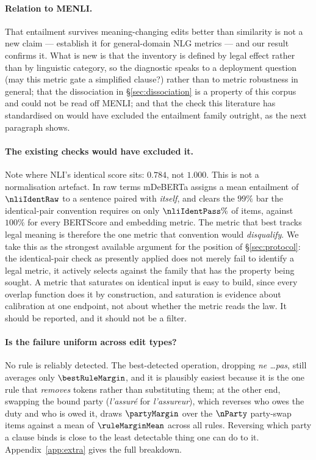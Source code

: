\documentclass[11pt]{article}
\begin{document}
\paragraph{Relation to \textsc{MENLI}.}
That entailment survives meaning-changing edits better than similarity is not a
new claim --- \citet{chen2023menli} establish it for general-domain NLG metrics
--- and our result confirms it. What is new is that the inventory is defined by
legal effect rather than by linguistic category, so the diagnostic speaks to a
deployment question (may this metric gate a simplified clause?) rather than to
metric robustness in general; that the dissociation in \S\ref{sec:dissociation}
is a property of this corpus and could not be read off \textsc{MENLI}; and that
the check this literature has standardised on would have excluded the entailment
family outright, as the next paragraph shows.

\paragraph{The existing checks would have excluded it.}
Note where NLI's identical score sits: $0.784$, not $1.000$. This is not a
normalisation artefact. In raw terms mDeBERTa assigns a mean entailment of
$\nliIdentRaw$ to a sentence paired with \emph{itself}, and clears the $99\%$
bar the identical-pair convention requires on only $\nliIdentPass\%$ of items,
against $100\%$ for every BERTScore and embedding metric. The metric that best
tracks legal meaning is therefore the one metric that convention would
\emph{disqualify}. We take this as the strongest available argument for the
position of \S\ref{sec:protocol}: the identical-pair check as presently applied
does not merely fail to identify a legal metric, it actively selects against the
family that has the property being sought. A metric that saturates on identical
input is easy to build, since every overlap function does it by construction,
and saturation is evidence about calibration at one endpoint, not about whether
the metric reads the law. It should be reported, and it should not be a filter.

\paragraph{Is the failure uniform across edit types?}
No rule is reliably detected. The best-detected operation, dropping \emph{ne
\dots pas}, still averages only $\bestRuleMargin$, and it is plausibly easiest
because it is the one rule that \emph{removes} tokens rather than substituting
them; at the other end, swapping the bound party (\emph{l'assur\'e} for
\emph{l'assureur}), which reverses who owes the duty and who is owed it, draws
$\partyMargin$ over the $\nParty$ party-swap items against a mean of
$\ruleMarginMean$ across all rules. Reversing which party a clause binds is
close to the least detectable thing one can do to it. Appendix~\ref{app:extra}
gives the full breakdown.
\end{document}
